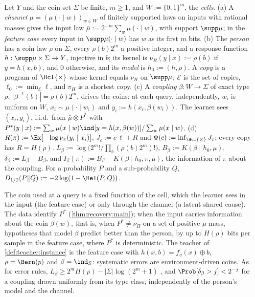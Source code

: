 \begin{definition}\label{def:imit:setting}
Let $Y$ and the coin set $\Sigma$ be finite, $m\ge1$, and $W:=\{0,1\}^m$, the \emph{cells}.
(a) A \emph{channel} $\mu=(\mu(\cdot\mid w))_{w\in W}$ of finitely supported laws on inputs with rational masses gives the input law $\bar\mu:=2^{-m}\sum_w\mu(\cdot\mid w)$, with support $\supp\mu$; in the \emph{feature case} every input in $\supp\mu(\cdot\mid w)$ has $w$ as its first $m$ bits.
(b) The \emph{person} has a coin law $\rho$ on $\Sigma$, every $\rho(b)2^m$ a positive integer, and a response function $h:\supp\mu\times\Sigma\to Y$, injective in $b$; its kernel is $\nu_H(y\mid x):=\rho(b)$ if $y=h(x,b)$, and $0$ otherwise, and its \emph{model} is $h_0:=(h,\rho)$. A \emph{copy} is a program of $\Hcl{\times}$ whose kernel equals $\nu_H$ on $\supp\mu$; $\mathcal E$ is the set of copies, $\ell_0:=\min_{\mathcal E}\ell$, and $\pi_H$ is a shortest copy.
(c) A \emph{coupling} $\beta:W\to\Sigma$ of exact type $\rho$, $|\beta^{-1}(b)|=\rho(b)2^m$, drives the coins: at each query, independently, $w_i$ is uniform on $W$, $x_i\sim\mu(\cdot\mid w_i)$ and $y_i:=h(x_i,\beta(w_i))$. The learner sees $(x_i,y_i)$, i.i.d.\ from $\bar\mu\otimes P^*$ with $P^*(y\mid x):=\sum_w\mu(x\mid w)\ind[y=h(x,\beta(w))]/\sum_w\mu(x\mid w)$.
(d) $R(\pi):=\Ex[-\log\nu_\pi(y_i\mid x_i)]$, $J_c:=c\,\ell+R$ and $\Phi(c):=\inf_{\Hcl{\times}}J_c$; every copy has $R=H(\rho)$. $L_\beta:=\log\big(2^m!/\prod_b(\rho(b)2^m)!\big)$, $B_\beta:=K(\beta\mid h_0,\mu)$, $\delta_\beta:=L_\beta-B_\beta$, and $I_\beta(\pi):=B_\beta-K(\beta\mid h_0,\pi,\mu)$, the information of $\pi$ about the coupling. For a probability $P$ and a sub-probability $Q$, $D_{1/2}(P\Vert Q):=-2\log(1-\Hel(P,Q))$.
\end{definition}

The coin used at a query is a fixed function of the cell, which the learner sees in the input (the feature case) or only through the channel (a latent shared cause). The data identify $P^*$ (\cref{thm:recovery:main}); when the input carries information about the coin $\beta(w)$, that is, when $P^*\ne\nu_H$ on a set of positive $\bar\mu$-mass, hypotheses that model $\beta$ predict better than the person, by up to $H(\rho)$ bits per sample in the feature case, where $P^*$ is deterministic. The teacher of \cref{def:teacher:instance} is the feature case with $h(x,b)=f_a(x)\oplus b$, $\rho=\Bern(p)$ and $\beta=\ind_S$: systematic errors are environment-driven coins. As for error rules, $L_\beta\ge2^mH(\rho)-|\Sigma|\log(2^m+1)$ \citep{cover2006elements}, and $\Prob[\delta_\beta>j]<2^{-j}$ for a coupling drawn uniformly from its type class, independently of the person's model and the channel.

